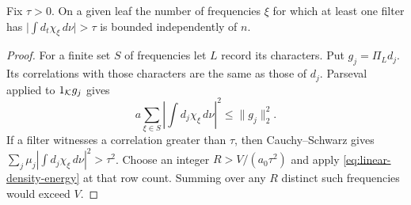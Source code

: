 \begin{lemma}\label{lem:linear-test}
Fix \(\tau>0\). On a given leaf the number of frequencies \(\xi\) for
which at least one filter has \(\big|\int d_t\chi_\xi\,d\nu\big|>\tau\)
is bounded independently of \(n\).
\end{lemma}
\begin{proof}
For a finite set \(S\) of frequencies let \(L\) record its characters.
Put \(g_j=\Pi_Ld_j\). Its correlations with those characters are the
same as those of \(d_j\). Parseval applied to \(1_{\mathcal K}g_j\) gives
\[
 a\sum_{\xi\in S}\left|\int d_j\chi_\xi\,d\nu\right|^2
 \le \|g_j\|_2^2 .
\]
If a filter witnesses a correlation greater than \(\tau\), then
Cauchy--Schwarz gives
\(\sum_j\mu_j|\int d_j\chi_\xi\,d\nu|^2>\tau^2\).
Choose an integer \(R>V/(a_0\tau^2)\) and apply
\eqref{eq:linear-density-energy} at that row count. Summing over any
\(R\) distinct such frequencies would exceed \(V\).
\end{proof}

